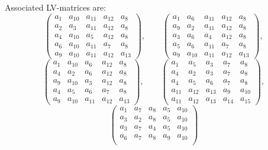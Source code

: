\documentclass{article}
\begin{document}
\begin{enumerate}[1.]
Associated LV-matrices are:
\[
\begin{pmatrix}
  a_{1} & a_{10} & a_{11} & a_{12} & a_{8} 
\\
 a_{2} & a_{3} & a_{11} & a_{12} & a_{8} 
\\
 a_{4} & a_{10} & a_{5} & a_{12} & a_{8} 
\\
 a_{6} & a_{10} & a_{11} & a_{7} & a_{8} 
\\
 a_{9} & a_{10} & a_{11} & a_{12} & a_{13} 
\end{pmatrix},\qquad
\begin{pmatrix}
  a_{1} & a_{6} & a_{11} & a_{12} & a_{8} 
\\
 a_{9} & a_{2} & a_{11} & a_{12} & a_{8} 
\\
 a_{3} & a_{6} & a_{4} & a_{12} & a_{8} 
\\
 a_{5} & a_{6} & a_{11} & a_{7} & a_{8} 
\\
 a_{9} & a_{10} & a_{11} & a_{12} & a_{13}  
\end{pmatrix},
\]
\begin{equation} \label{e1}
\begin{pmatrix}
  a_{1} & a_{10} & a_{6} & a_{12} & a_{8} 
\\
 a_{4} & a_{2} & a_{6} & a_{12} & a_{8} 
\\
 a_{9} & a_{10} & a_{3} & a_{12} & a_{8} 
\\
 a_{4} & a_{5} & a_{6} & a_{7} & a_{8} 
\\
 a_{9} & a_{10} & a_{11} & a_{12} & a_{13}  
\end{pmatrix}, \qquad
\begin{pmatrix}
  a_{1} & a_{5} & a_{3} & a_{7} & a_{8} 
\\
 a_{4} & a_{2} & a_{3} & a_{7} & a_{8} 
\\
 a_{4} & a_{5} & a_{6} & a_{7} & a_{8} 
\\
 a_{11} & a_{12} & a_{13} & a_{9} & a_{10} 
\\
 a_{11} & a_{12} & a_{13} & a_{14} & a_{15}  
\end{pmatrix},
\end{equation}
\begin{equation} \label{e2}
\begin{pmatrix}
  a_{1} & a_{7} & a_{8} & a_{5} & a_{10} 
\\
 a_{3} & a_{2} & a_{8} & a_{5} & a_{10} 
\\
 a_{3} & a_{7} & a_{4} & a_{5} & a_{10} 
\\
 a_{6} & a_{7} & a_{8} & a_{9} & a_{10} 
\\

\end{pmatrix}
\end{equation}
\end{enumerate}
\end{document}
